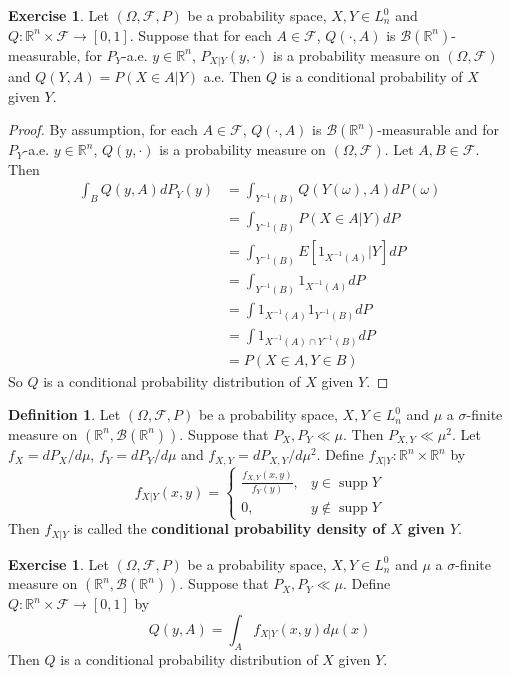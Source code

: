 \documentclass[12pt]{amsart}
\theoremstyle{definition}
\newtheorem{defn}[definition]{Definition}
\newtheorem{ex}[definition]{Exercise}
\newcommand{\sig}{\sigma}
\newcommand{\om}{\omega}
\newcommand{\Om}{\Omega}
\newcommand{\R}{\mathbb{R}}
\newcommand{\MB}{\mathcal{B}}
\newcommand{\MF}{\mathcal{F}}
\DeclareMathOperator{\supp}{supp}
\begin{document}
	\begin{ex}
	Let $(\Om, \MF, P)$ be a probability space, $X,Y \in L_n^0$ and $Q: \R^n \times \MF \rightarrow [0,1]$. Suppose that for each $A \in \MF$, $Q(\cdot, A)$ is $\MB(\R^n)$-measurable, for $P_Y$-a.e. $y \in \R^n$, $P_{X|Y}(y, \cdot)$ is a probability measure on $(\Om, \MF)$ and $Q(Y, A) = P(X \in A|Y)$ a.e. Then $Q$ is a conditional probability of $X$ given $Y$.
	\end{ex}	
	
	\begin{proof}
	By assumption, for each $A \in \MF$, $Q(\cdot, A)$ is $\MB(\R^n)$-measurable and for $P_Y$-a.e. $y \in \R^n$, $Q(y, \cdot)$ is a probability measure on $(\Om, \MF)$. Let $A,B \in \MF$. Then
	\begin{align*}
	\int_B Q(y, A) dP_Y(y)
	&= \int_{Y^{-1}(B)} Q(Y(\om), A) dP(\om) \\
	&= \int_{Y^{-1}(B)}  P(X \in A|Y) dP \\
	&= \int_{Y^{-1}(B)}  E[1_{X^{-1}(A)}|Y] dP \\
	&= \int_{Y^{-1}(B)}  1_{X^{-1}(A)} dP \\
	&= \int 1_{X^{-1}(A)}  1_{Y^{-1}(B)} dP \\
	&= \int 1_{X^{-1}(A) \cap Y^{-1}(B)} dP \\
	&= P(X \in A, Y \in B)
	\end{align*}
	So $Q$ is a conditional probability distribution of $X$ given $Y$.
	\end{proof}
	
	\begin{defn}
	Let $(\Om, \MF, P)$ be a probability space, $X,Y \in L_n^0$ and $\mu$ a $\sig$-finite measure on $(\R^n, \MB(\R^n))$. Suppose that $P_X, P_Y \ll \mu$. Then $P_{X,Y} \ll \mu^2$. Let $f_X = dP_X/d \mu$, $f_Y = dP_Y/d \mu$ and $f_{X,Y} = dP_{X,Y}/d \mu^2$. Define $f_{X|Y}: \R^n \times \R^n$ by 
	\[
	f_{X|Y}(x,y) = 
	\begin{cases}
	\frac{f_{X,Y}(x,y)}{f_Y(y)},& y \in \supp Y \\
	0, &y \not \in \supp Y 
	\end{cases}
	\] 
	Then $f_{X|Y}$ is called the \textbf{conditional probability density of $X$ given $Y$}.
	\end{defn}	
	
	\begin{ex}
	Let $(\Om, \MF, P)$ be a probability space, $X,Y \in L_n^0$ and $\mu$ a $\sig$-finite measure on $(\R^n, \MB(\R^n))$. Suppose that $P_X, P_Y \ll \mu$. Define $Q: \R^n \times \MF \rightarrow [0,1]$ by 
	$$Q(y, A) = \int_A f_{X|Y}(x,y) d\mu(x)$$ 
	Then $Q$ is a conditional probability distribution of $X$ given $Y$.
	\end{ex}	
	
\end{document}
